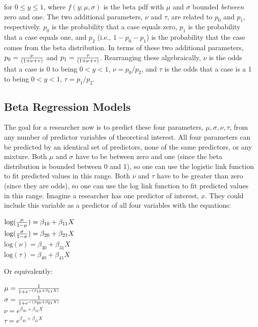 \documentclass[english,man]{apa6}
\theoremstyle{definition}
\theoremstyle{definition}
\theoremstyle{remark}
\begin{document}
for \(0 \leq y \leq 1\), where \(f(y;\mu,\sigma)\) is the beta pdf with
\(\mu\) and \(\sigma\) bounded \emph{between} zero and one. The two
additional parameters, \(\nu\) and \(\tau\), are related to \(p_0\) and
\(p_1\), respectively. \(p_0\) is the probability that a case equals
zero, \(p_1\) is the probability that a case equals one, and \(p_2\)
(i.e., \(1 - p_0 - p_1\)) is the probability that the case comes from
the beta distribution. In terms of these two additional parameters,
\(p_0 = {\nu \over (1 + \nu + \tau)}\) and
\(p_1 = {\tau \over (1 + \nu + \tau)}\). Rearranging these
algebraically, \(\nu\) is the odds that a case is 0 to being
\(0 < y < 1\), \(\nu = p_0 / p_2\), and \(\tau\) is the odds that a case
is a 1 to being \(0 < y < 1\), \(\tau = p_1 / p_2\).

\subsection{Beta Regression Models}\label{beta-regression-models}

The goal for a researcher now is to predict these four parameters,
\(\mu, \sigma, \nu, \tau\), from any number of predictor variables of
theoretical interest. All four parameters can be predicted by an
identical set of predictors, none of the same predictors, or any
mixture. Both \(\mu\) and \(\sigma\) have to be between zero and one
(since the beta distribution is bounded between 0 and 1), so one can use
the logistic link function to fit predicted values in this range. Both
\(\nu\) and \(\tau\) have to be greater than zero (since they are odds),
so one can use the log link function to fit predicted values in this
range. Imagine a researcher has one predictor of interest, \(x\). They
could include this variable as a predictor of all four variables with
the equations:

\begin{center}
$\text{log}({\mu \over 1 - \mu}) = \beta_{10} + \beta_{11}X$\\
$\text{log}({\sigma \over 1 - \sigma}) = \beta_{20} + \beta_{21}X$\\
$\text{log}(\nu) = \beta_{30} + \beta_{31}X$\\
$\text{log}(\tau) = \beta_{40} + \beta_{41}X$
\end{center}

Or equivalently:

\begin{center}
$\mu={1\over1+e^{-(\beta_{10}+\beta_{11}X)}}$\\
$\sigma={1\over1+e^{-(\beta_{20}+\beta_{21}X)}}$\\
$\nu = e^{\beta_{30} + \beta_{31}X}$\\
$\tau = e^{\beta_{40} + \beta_{41}X}$
\end{center}
\end{document}
